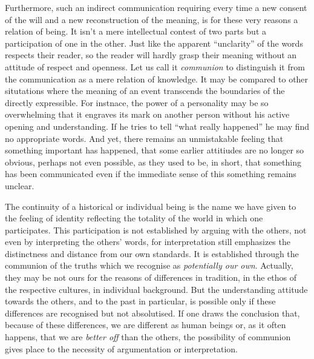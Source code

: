 Furthermore, such an indirect communication requiring every time a new consent
of the will and a new reconstruction of the meaning, is for these very reasons
a relation of being. 
It isn't a mere intellectual contest of two parts but a
participation of one in the other. Just like the apparent ``unclarity'' of
the words respects their reader, so the reader will hardly grasp their meaning
without an attitude of respect and openness.
Let us call it {\em communion} to distinguish it from the
communication as a mere relation of knowledge.
It may be compared to other situtations where the meaning of an event
transcends the boundaries of the directly expressible. For instnace, the power 
of a personality may be so overwhelming that it engraves its mark on another 
person
without his active opening and understanding. If he tries to tell ``what
really happened'' he may find no appropriate words. And yet, there remains an
unmistakable feeling that something important has happened, that some earlier
attitiudes are no longer so obvious, perhaps not even possible, as they used
to be, in short, that something has been communicated even if the immediate
sense of this something remains unclear.

The continuity of a historical or individual being is 
the name we have given to the feeling of identity reflecting the totality
of the world in which one participates.
 This participation is not established by arguing with the others, not even by
interpreting the others' words, for interpretation still emphasizes the distinctness 
and distance from our own standards. It is established
through the communion of the truths which we recognise as {\em potentially 
our own}. Actually, they may be not ours for the reasons of differences in 
tradition, in the ethos of the respective cultures, in individual background.
But the understanding attitude towards the others, and to the past in 
particular, is possible only if these differences are recognised but not
absolutised. If one draws the conclusion that, because of these differences, we
are different as human beings or, as it often happens, that  we are 
{\em better off} than the others, the possibility of communion gives place to
the necessity of argumentation or interpretation.

